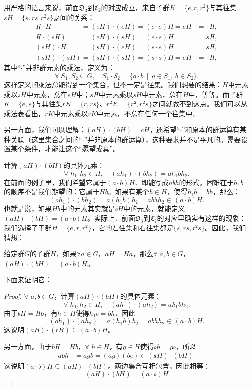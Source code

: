 \documentclass[12pt,UTF8,fontset=none]{ctexbook}
\begin{document}
用严格的语言来说，前面$\mathfrak{D}_3$到$\mathfrak{C}_2$的对应成立，来自子群$H=\{e,r,r^2\}$与其往集$sH=\{s,rs,r^2s\}$之间的关系：
$$
\begin{array}{lr}
    H \cdot H \phantom{(s)}\phantom{(s)} = (eH)\cdot (eH) = (e\cdot e)H = eH &=\phantom{s} H , \\
     H \cdot (sH)\phantom{(s)} = (eH)\cdot (sH) = (e\cdot s)H &= sH, \\
    (sH)\cdot H \phantom{(s)}= (sH)\cdot (eH) = (s\cdot e)H &= sH, \\
    (sH)\cdot (sH) = (sH)\cdot (sH) = (s\cdot s)H = eH &=\phantom{s} H ,
\end{array}
$$
其中“$\cdot$”并非群元素的乘法，定义为：
$$ \forall\;S_1,S_2\subseteq G,\quad S_1\cdot S_2 = \{a\cdot b \,\mid\, a\in S_1,\;b\in S_2\}. $$
这样定义的乘法总能得到一个集合，但不一定是往集。我们想要的结果：$H$中元素乘以$sH$中元素，总在$sH$中；$sH$中元素乘以$sH$中元素，总在$H$中，等等。而子群$K=\{e,s\}$与其往集$rK=\{r,rs\}$、$r^2K=\{r^2,r^2s\}$之间就做不到这点。我们可以从乘法表看出，$rK$中元素乘以$rK$中元素，不总在任何一个往集中。

另一方面，我们可以理解：$(aH)\cdot(bH)=cH$，还希望“$\cdot$”和原本的群运算有某种关联（这里集合之间的“$\cdot$”并非原本的群运算），这种要求并不是平凡的。需要设置某个条件，才能让这个“愿望成真”。

计算$(aH)\cdot(bH)$的具体元素：
\[\forall \; h_1,h_2\in H,\quad (ah_1)\cdot (bh_2) = ah_1bh_2.\]
在前面的例子里，我们希望它属于$(a\cdot b)H$，即能写成$abh$的形式。困难在于$h_1b$的顺序不是我们期望的：它属于$Hb$。如果有某个$h\in H$，使得$h_1b=bh$，那么：
$$ (ah_1)\cdot (bh_2) = a(h_1b)h_2 = abhh_2 \in \, (a\cdot b)H. $$
也就是说，如果$Hb$中的元素其实就是$bH$中的元素，就能定义$(aH)\cdot(bH)=(a\cdot b)H$。实际上，前面$\mathfrak{D}_3$到$\mathfrak{C}_2$的对应里确实有这样的现象：我们选择了子群$H=\{e,r,r^2\}$，它的左往集和右往集都是$\{s,rs,r^2s\}$。因此，我们猜想：
\begin{pp}\label{pp:5-10}
    给定群$G$的子群$H$，如果$\forall a\in G$，$aH = Ha$，那么$\forall \; a,b\in G$，$(aH)\cdot(bH) = (a\cdot b)H$。
\end{pp}
下面来证明它：
\begin{proof}
    $\forall \; a,b\in G$，计算$(aH)\cdot(bH)$的具体元素：
    \[\forall \; h_1,h_2\in H,\quad (ah_1)\cdot (ah_2) = ah_1bh_2.\]
    由于$bH = Hb$，有$h\in H$使得$h_1b=bh$，因此
    $$ (ah_1)\cdot (ah_2) = a(h_1b)h_2 = abhh_2 \in \, (a\cdot b)H. $$
    这说明$(aH)\cdot(bH) \subseteq (a\cdot b)H$。

    另一方面，由于$bH = Hb$，$\forall\; h\in H$，有$g\in H$使得$bh = gb$，所以
    \begin{align*}
        abh &= agb = (ag)(be)\in (aH)\cdot(bH).
    \end{align*}
    这说明$(a\cdot b)H\subseteq(aH)\cdot(bH)$。两边集合互相包含，因此相等：
    $$ (aH)\cdot(bH) = (a\cdot b)H $$
\end{proof}
\end{document}
